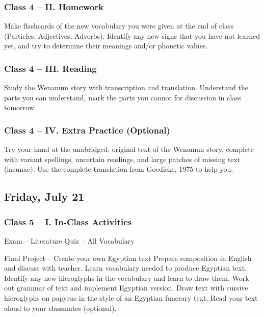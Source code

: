 \documentclass[11pt]{article}
\begin{document}
		\subsubsection*{Class 4 -- II. Homework}
			Make flashcards of the new vocabulary you were given at the end of class (Particles, Adjectives, Adverbs).
			Identify any new signs that you have not learned yet, and try to determine their meanings and/or phonetic values.
			
		\subsubsection*{Class 4 -- III. Reading}
			Study the Wenamun story with transcription and translation.
			Understand the parts you can understand, mark the parts you cannot for discussion in class tomorrow.
			
		\subsubsection*{Class 4 -- IV. Extra Practice (Optional)}
			Try your hand at the unabridged, original text of the Wenamun story,
				complete with variant spellings, uncertain readings, and large patches of missing text (lacunae).
			Use the complete translation from Goedicke, 1975 to help you.
			
	\subsection*{Friday, July 21}
		\subsubsection*{Class 5 -- I. In-Class Activities}
			\begin{outline}[itemize]
				\1 Exam -- Literature
				\1 Quiz -- All Vocabulary
				
				\1 Final Project -- Create your own Egyptian text
					\2 Prepare composition in English and discuss with teacher.
					\2 Learn vocabulary needed to produce Egyptian text.
					\2 Identify any new hieroglyphs in the vocabulary and learn to draw them.
					\2 Work out grammar of text and implement Egyptian version.
					\2 Draw text with cursive hieroglyphs on papyrus in the style of an Egyptian funerary text.
					\2 Read your text aloud to your classmates (optional).
				
					
			\end{outline}
	
%	
\end{document}
